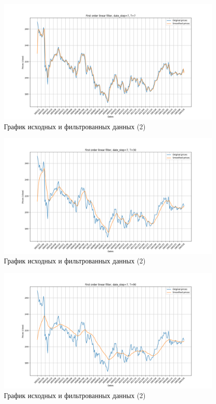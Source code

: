\documentclass[a4paper, 12pt]{article}
\begin{document}
    \begin{figure}[H]
        \centering
        \includegraphics[scale=0.35]{2_7.png}
        \captionsetup{skip=0pt}
        \caption{График исходных и фильтрованных данных (2)}
        \label{fig:172}
    \end{figure}
    \begin{figure}[H]
        \centering
        \includegraphics[scale=0.35]{2_30.png}
        \captionsetup{skip=0pt}
        \caption{График исходных и фильтрованных данных (2)}
        \label{fig:302}
    \end{figure}
    \begin{figure}[H]
        \centering
        \includegraphics[scale=0.35]{2_90.png}
        \captionsetup{skip=0pt}
        \caption{График исходных и фильтрованных данных (2)}
        \label{fig:902}
    \end{figure}
\end{document}
